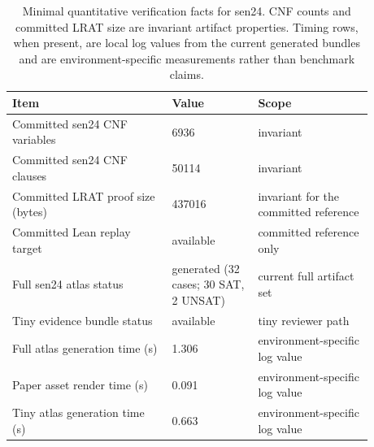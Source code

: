 \begin{table}[t]
\centering
\small
\begin{tabular}{p{0.39\linewidth} p{0.21\linewidth} p{0.28\linewidth}}
\toprule
Item & Value & Scope \\
\midrule
Committed sen24 CNF variables & 6936 & invariant \\
Committed sen24 CNF clauses & 50114 & invariant \\
Committed LRAT proof size (bytes) & 437016 & invariant for the committed reference \\
Committed Lean replay target & available & committed reference only \\
Full sen24 atlas status & generated (32 cases; 30 SAT, 2 UNSAT) & current full artifact set \\
Tiny evidence bundle status & available & tiny reviewer path \\
Full atlas generation time (s) & 1.306 & environment-specific log value \\
Paper asset render time (s) & 0.091 & environment-specific log value \\
Tiny atlas generation time (s) & 0.663 & environment-specific log value \\
\bottomrule
\end{tabular}
\caption{Minimal quantitative verification facts for sen24. CNF counts and committed LRAT size are invariant artifact properties. Timing rows, when present, are local log values from the current generated bundles and are environment-specific measurements rather than benchmark claims.}
\label{tab:sen24-verification-stats}
\end{table}
